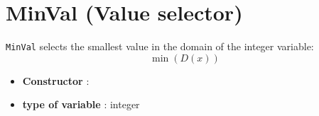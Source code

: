 \section{MinVal (Value selector)}\label{minval:minvalvalselector}\hypertarget{minval:minvalvalselector}{}
\begin{notedef}
  \texttt{MinVal} selects the smallest value in the domain of the integer variable:
$$\min(D(x))$$
\end{notedef}

\begin{itemize}
	\item \textbf{Constructor} : 
	\item \textbf{type of variable} : integer
\end{itemize}

%

